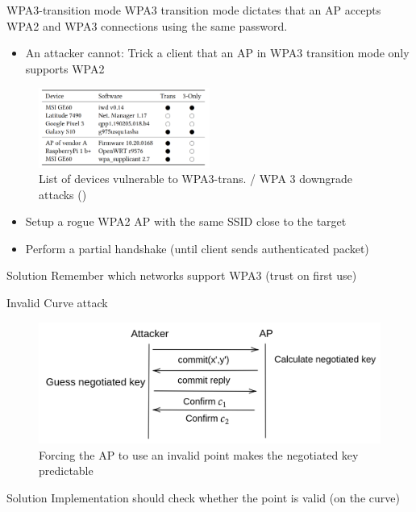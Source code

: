 \documentclass[xcolor=table]{bredelebeamer}
\begin{document}
\begin{frame}{WPA3-transition mode}
    WPA3 transition mode dictates that an AP accepts WPA2 and WPA3 connections using the same password.
    \begin{itemize}
        \item An attacker cannot: Trick a client that an AP in WPA3 transition mode only supports WPA2
    \end{itemize}
   \begin{figure}
       \centering
       \includegraphics[width=0.5\textwidth]{wpa3_downgrade.png}
       \caption{List of devices vulnerable to WPA3-trans. / WPA 3 downgrade attacks (\cite{vanhoef-sp2020-dragonblood})}
       \label{fig:my_label}
   \end{figure}
    \begin{itemize}
        \item Setup a rogue WPA2 AP with the same SSID close to the target
        \item Perform a partial handshake (until client sends authenticated packet)
    \end{itemize}
    \begin{exampleblock}{Solution}
    Remember which networks support WPA3 (trust on first use)
    \end{exampleblock}
\end{frame}
\begin{frame}{Invalid Curve attack}
\begin{figure}
    \centering
   \includegraphics[width=1\textwidth]{invalidcurve.png}
    \caption{Forcing the AP to use an invalid point makes the negotiated key predictable}
    \label{fig:my_label}
\end{figure}
\begin{exampleblock}{Solution}
Implementation should check whether the point is valid (on the curve)
\end{exampleblock}
\end{frame}
\end{document}
